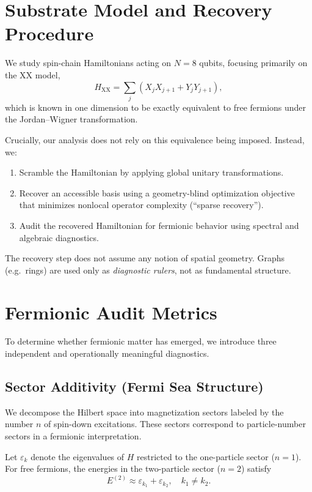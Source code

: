 \documentclass[11pt]{article}
\begin{document}
\section{Substrate Model and Recovery Procedure}

We study spin-chain Hamiltonians acting on $N=8$ qubits, focusing primarily on the XX model,
\begin{equation}
H_{\mathrm{XX}} = \sum_{j} \left( X_j X_{j+1} + Y_j Y_{j+1} \right),
\end{equation}
which is known in one dimension to be exactly equivalent to free fermions under the Jordan--Wigner transformation.

Crucially, our analysis does not rely on this equivalence being imposed. Instead, we:
\begin{enumerate}
    \item Scramble the Hamiltonian by applying global unitary transformations.
    \item Recover an accessible basis using a geometry-blind optimization objective that minimizes nonlocal operator complexity (``sparse recovery'').
    \item Audit the recovered Hamiltonian for fermionic behavior using spectral and algebraic diagnostics.
\end{enumerate}

The recovery step does not assume any notion of spatial geometry. Graphs (e.g.\ rings) are used only as \emph{diagnostic rulers}, not as fundamental structure.

\section{Fermionic Audit Metrics}

To determine whether fermionic matter has emerged, we introduce three independent and operationally meaningful diagnostics.

\subsection{Sector Additivity (Fermi Sea Structure)}

We decompose the Hilbert space into magnetization sectors labeled by the number $n$ of spin-down excitations. These sectors correspond to particle-number sectors in a fermionic interpretation.

Let $\varepsilon_k$ denote the eigenvalues of $H$ restricted to the one-particle sector ($n=1$). For free fermions, the energies in the two-particle sector ($n=2$) satisfy
\begin{equation}
E^{(2)} \approx \varepsilon_{k_1} + \varepsilon_{k_2}, \quad k_1 \neq k_2.
\end{equation}
\end{document}
